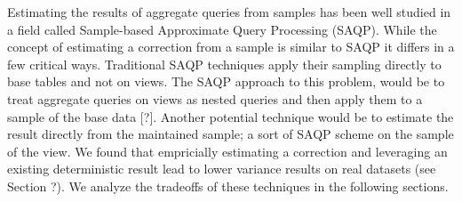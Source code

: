Estimating the results of aggregate queries from samples has been
well studied in a field called Sample-based Approximate Query Processing
(SAQP). While the concept of estimating a correction from a sample
is similar to SAQP it differs in a few critical ways. Traditional
SAQP techniques apply their sampling directly to base tables and not
on views. The SAQP approach to this problem, would be to treat aggregate
queries on views as nested queries and then apply them to a sample
of the base data {[}?{]}. Another potential technique would be to
estimate the result directly from the maintained sample; a sort of
SAQP scheme on the sample of the view. We found that empricially estimating
a correction and leveraging an existing deterministic result lead
to lower variance results on real datasets (see Section ?). We analyze
the tradeoffs of these techniques in the following sections.